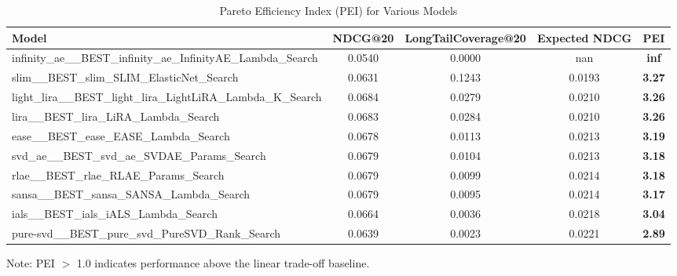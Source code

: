 
\begin{table}[htbp]
\centering
\caption{Pareto Efficiency Index (PEI) for Various Models}
\label{tab:pei_analysis}
\begin{tabular}{lcccc}
\toprule
\textbf{Model} & \textbf{NDCG@20} & \textbf{LongTailCoverage@20} & \textbf{Expected NDCG} & \textbf{PEI} \\
\midrule
infinity_ae__BEST_infinity_ae_InfinityAE_Lambda_Search & 0.0540 & 0.0000 & nan & \textbf{inf} \\
slim__BEST_slim_SLIM_ElasticNet_Search & 0.0631 & 0.1243 & 0.0193 & \textbf{3.27} \\
light_lira__BEST_light_lira_LightLiRA_Lambda_K_Search & 0.0684 & 0.0279 & 0.0210 & \textbf{3.26} \\
lira__BEST_lira_LiRA_Lambda_Search & 0.0683 & 0.0284 & 0.0210 & \textbf{3.26} \\
ease__BEST_ease_EASE_Lambda_Search & 0.0678 & 0.0113 & 0.0213 & \textbf{3.19} \\
svd_ae__BEST_svd_ae_SVDAE_Params_Search & 0.0679 & 0.0104 & 0.0213 & \textbf{3.18} \\
rlae__BEST_rlae_RLAE_Params_Search & 0.0679 & 0.0099 & 0.0214 & \textbf{3.18} \\
sansa__BEST_sansa_SANSA_Lambda_Search & 0.0679 & 0.0095 & 0.0214 & \textbf{3.17} \\
ials__BEST_ials_iALS_Lambda_Search & 0.0664 & 0.0036 & 0.0218 & \textbf{3.04} \\
pure-svd__BEST_pure_svd_PureSVD_Rank_Search & 0.0639 & 0.0023 & 0.0221 & \textbf{2.89} \\

\bottomrule
\end{tabular}
\vspace{5pt}
\footnotesize{Note: PEI $>$ 1.0 indicates performance above the linear trade-off baseline.}
\end{table}
